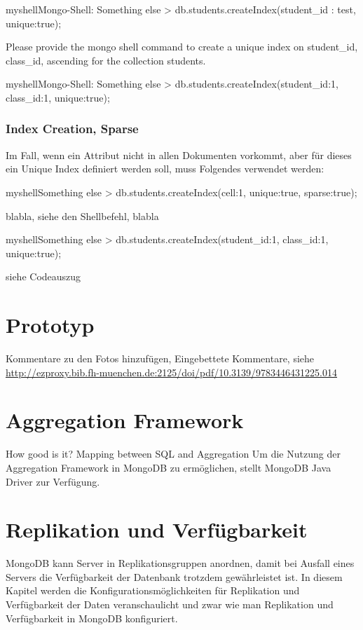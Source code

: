 \begin{listingsboxShell}[label={lst:X}]{myshell}{Mongo-Shell: Something else}
> db.students.createIndex({student_id : test}, {unique:true});
\end{listingsboxShell}

Please provide the mongo shell command to create a unique index on student\_id, class\_id, ascending for the collection students.

\begin{listingsboxShell}[label={lst:X}]{myshell}{Mongo-Shell: Something else}
> db.students.createIndex({student_id:1, class_id:1}, {unique:true});
\end{listingsboxShell}

\subsubsection{Index Creation, Sparse}

Im Fall, wenn ein Attribut nicht in allen Dokumenten vorkommt, aber für dieses ein Unique Index definiert werden soll, muss Folgendes verwendet werden:

\begin{listingsboxShell}[label={lst:X}]{myshell}{Something else}
> db.students.createIndex({cell:1}, {unique:true, sparse:true});
\end{listingsboxShell}

blabla, siehe den Shellbefehl, blabla

\begin{listingsboxShell}[label={lst:X}]{myshell}{Something else}
> db.students.createIndex({student_id:1, class_id:1}, {unique:true});
\end{listingsboxShell}
siehe Codeauszug 

\section{Prototyp}
Kommentare zu den Fotos hinzufügen, Eingebettete Kommentare, siehe \url{http://ezproxy.bib.fh-muenchen.de:2125/doi/pdf/10.3139/9783446431225.014}

\section{Aggregation Framework}
How good is it? Mapping between SQL and Aggregation
Um die Nutzung der Aggregation Framework in MongoDB zu ermöglichen, stellt MongoDB Java Driver zur Verfügung. 

\section{Replikation und Verfügbarkeit}
MongoDB kann Server in Replikationsgruppen anordnen, damit bei Ausfall eines Servers die Verfügbarkeit der Datenbank trotzdem gewährleistet ist. In diesem Kapitel werden die Konfigurationsmöglichkeiten für Replikation und Verfügbarkeit der Daten veranschaulicht und zwar wie man Replikation und Verfügbarkeit in MongoDB konfiguriert.
